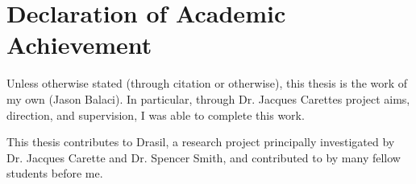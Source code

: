 \chapter{Declaration of Academic Achievement}
\label{chap:declaration_of_academic_achievement}

Unless otherwise stated (through citation or otherwise), this thesis is the work
of my own (Jason Balaci). In particular, through Dr. Jacques Carettes project
aims, direction, and supervision, I was able to complete this work.

This thesis contributes to Drasil, a research project principally investigated
by Dr. Jacques Carette and Dr. Spencer Smith, and contributed to by many
fellow students before me.
